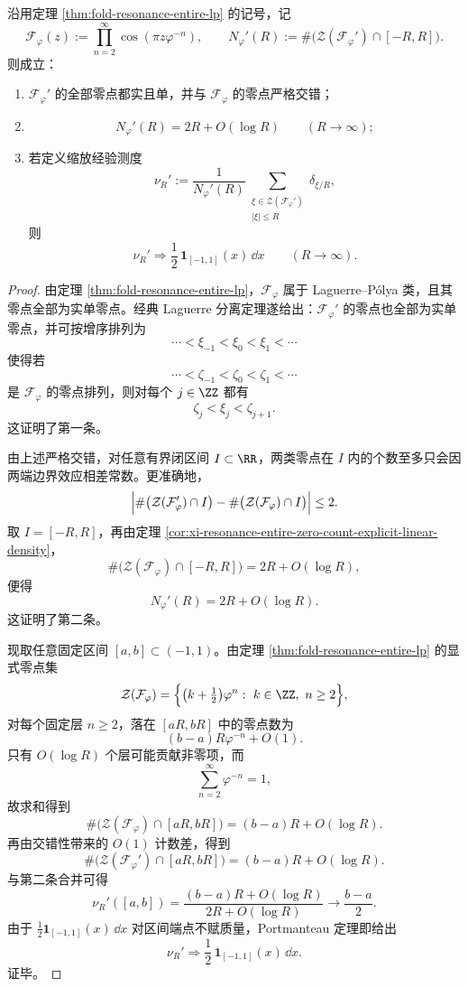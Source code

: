 \begin{theorem}[共振整函数导函数的实临界点交错与缩放均匀律]\label{thm:xi-time-part76-resonance-derivative-critical-cloud-uniform}
沿用定理 \ref{thm:fold-resonance-entire-lp} 的记号，记
\[
\mathcal F_\varphi(z):=\prod_{n=2}^{\infty}\cos(\pi z\varphi^{-n}),
\qquad
N_\varphi'(R):=
\#\bigl(\mathcal Z(\mathcal F_\varphi')\cap[-R,R]\bigr).
\]
则成立：
\begin{enumerate}
  \item \(\mathcal F_\varphi'\) 的全部零点都实且单，并与 \(\mathcal F_\varphi\) 的零点严格交错；
  \item
  \[
  N_\varphi'(R)=2R+O(\log R)
  \qquad(R\to\infty);
  \]
  \item 若定义缩放经验测度
  \[
  \nu_R'
  :=
  \frac{1}{N_\varphi'(R)}
  \sum_{\substack{\xi\in\mathcal Z(\mathcal F_\varphi')\\ |\xi|\le R}}
  \delta_{\xi/R},
  \]
  则
  \[
  \nu_R'\Longrightarrow \frac12\,\mathbf 1_{[-1,1]}(x)\,\dd x
  \qquad (R\to\infty).
  \]
\end{enumerate}
\end{theorem}
\begin{proof}
由定理 \ref{thm:fold-resonance-entire-lp}，\(\mathcal F_\varphi\) 属于 Laguerre--P\'olya 类，且其零点全部为实单零点。经典 Laguerre 分离定理遂给出：\(\mathcal F_\varphi'\) 的零点也全部为实单零点，并可按增序排列为
\[
\cdots<\xi_{-1}<\xi_0<\xi_1<\cdots
\]
使得若
\[
\cdots<\zeta_{-1}<\zeta_0<\zeta_1<\cdots
\]
是 \(\mathcal F_\varphi\) 的零点排列，则对每个 \(j\in\ZZ\) 都有
\[
\zeta_j<\xi_j<\zeta_{j+1}.
\]
这证明了第一条。

由上述严格交错，对任意有界闭区间 \(I\subset\RR\)，两类零点在 \(I\) 内的个数至多只会因两端边界效应相差常数。更准确地，
\[
\Bigl|
\#\bigl(\mathcal Z(\mathcal F_\varphi')\cap I\bigr)
-
\#\bigl(\mathcal Z(\mathcal F_\varphi)\cap I\bigr)
\Bigr|
\le 2.
\]
取 \(I=[-R,R]\)，再由定理 \ref{cor:xi-resonance-entire-zero-count-explicit-linear-density}，
\[
\#\bigl(\mathcal Z(\mathcal F_\varphi)\cap[-R,R]\bigr)=2R+O(\log R),
\]
便得
\[
N_\varphi'(R)=2R+O(\log R).
\]
这证明了第二条。

现取任意固定区间 \([a,b]\subset(-1,1)\)。由定理 \ref{thm:fold-resonance-entire-lp} 的显式零点集
\[
\mathcal Z(\mathcal F_\varphi)
=
\Bigl\{\bigl(k+\tfrac12\bigr)\varphi^n:\ k\in\ZZ,\ n\ge 2\Bigr\},
\]
对每个固定层 \(n\ge 2\)，落在 \([aR,bR]\) 中的零点数为
\[
(b-a)R\varphi^{-n}+O(1).
\]
只有 \(O(\log R)\) 个层可能贡献非零项，而
\[
\sum_{n=2}^{\infty}\varphi^{-n}=1,
\]
故求和得到
\[
\#\bigl(\mathcal Z(\mathcal F_\varphi)\cap[aR,bR]\bigr)
=(b-a)R+O(\log R).
\]
再由交错性带来的 \(O(1)\) 计数差，得到
\[
\#\bigl(\mathcal Z(\mathcal F_\varphi')\cap[aR,bR]\bigr)
=(b-a)R+O(\log R).
\]
与第二条合并可得
\[
\nu_R'([a,b])
=
\frac{(b-a)R+O(\log R)}{2R+O(\log R)}
\longrightarrow
\frac{b-a}{2}.
\]
由于 \(\frac12\mathbf 1_{[-1,1]}(x)\,\dd x\) 对区间端点不赋质量，Portmanteau 定理即给出
\[
\nu_R'\Longrightarrow \frac12\,\mathbf 1_{[-1,1]}(x)\,\dd x.
\]
证毕。
\end{proof}

